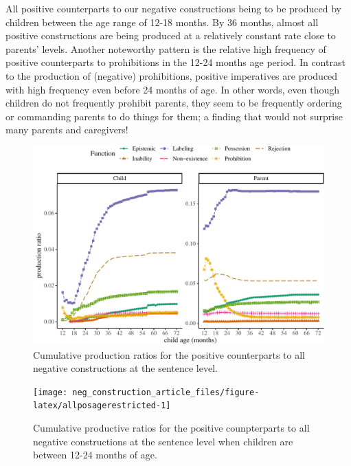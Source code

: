\documentclass[
  man,floatsintext]{apa6}
\begin{document}
All positive counterparts to our negative constructions being to be produced by children between the age range of 12-18 months. By 36 months, almost all positive constructions are being produced at a relatively constant rate close to parents' levels. Another noteworthy pattern is the relative high frequency of positive counterparts to prohibitions in the 12-24 months age period. In contrast to the production of (negative) prohibitions, positive imperatives are produced with high frequency even before 24 months of age. In other words, even though children do not frequently prohibit parents, they seem to be frequently ordering or commanding parents to do things for them; a finding that would not surprise many parents and caregivers!

\begin{figure}[H]

{\centering \includegraphics{neg_construction_article_files/figure-latex/allpos-1} 

}

\caption{Cumulative production ratios for the positive counterparts to all negative constructions at the sentence level.}\label{fig:allpos}
\end{figure}

\begin{figure}[H]

{\centering \texttt{[image: neg\_construction\_article\_files/figure-latex/allposagerestricted-1]} 

}

\caption{Cumulative productive ratios for the positive counpterparts to all negative constructions at the sentence level when children are between 12-24 months of age.}\label{fig:allposagerestricted}
\end{figure}
\end{document}
